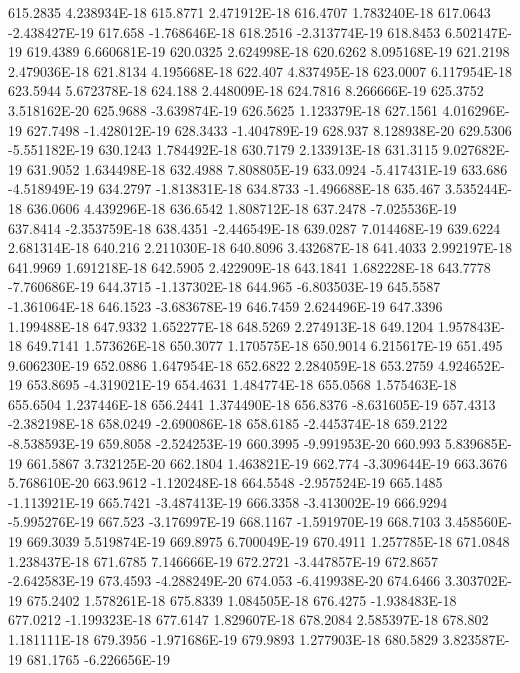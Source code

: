 615.2835  4.238934E-18
615.8771  2.471912E-18
616.4707  1.783240E-18
617.0643  -2.438427E-19
617.658  -1.768646E-18
618.2516  -2.313774E-19
618.8453  6.502147E-19
619.4389  6.660681E-19
620.0325  2.624998E-18
620.6262  8.095168E-19
621.2198  2.479036E-18
621.8134  4.195668E-18
622.407  4.837495E-18
623.0007  6.117954E-18
623.5944  5.672378E-18
624.188  2.448009E-18
624.7816  8.266666E-19
625.3752  3.518162E-20
625.9688  -3.639874E-19
626.5625  1.123379E-18
627.1561  4.016296E-19
627.7498  -1.428012E-19
628.3433  -1.404789E-19
628.937  8.128938E-20
629.5306  -5.551182E-19
630.1243  1.784492E-18
630.7179  2.133913E-18
631.3115  9.027682E-19
631.9052  1.634498E-18
632.4988  7.808805E-19
633.0924  -5.417431E-19
633.686  -4.518949E-19
634.2797  -1.813831E-18
634.8733  -1.496688E-18
635.467  3.535244E-18
636.0606  4.439296E-18
636.6542  1.808712E-18
637.2478  -7.025536E-19
637.8414  -2.353759E-18
638.4351  -2.446549E-18
639.0287  7.014468E-19
639.6224  2.681314E-18
640.216  2.211030E-18
640.8096  3.432687E-18
641.4033  2.992197E-18
641.9969  1.691218E-18
642.5905  2.422909E-18
643.1841  1.682228E-18
643.7778  -7.760686E-19
644.3715  -1.137302E-18
644.965  -6.803503E-19
645.5587  -1.361064E-18
646.1523  -3.683678E-19
646.7459  2.624496E-19
647.3396  1.199488E-18
647.9332  1.652277E-18
648.5269  2.274913E-18
649.1204  1.957843E-18
649.7141  1.573626E-18
650.3077  1.170575E-18
650.9014  6.215617E-19
651.495  9.606230E-19
652.0886  1.647954E-18
652.6822  2.284059E-18
653.2759  4.924652E-19
653.8695  -4.319021E-19
654.4631  1.484774E-18
655.0568  1.575463E-18
655.6504  1.237446E-18
656.2441  1.374490E-18
656.8376  -8.631605E-19
657.4313  -2.382198E-18
658.0249  -2.690086E-18
658.6185  -2.445374E-18
659.2122  -8.538593E-19
659.8058  -2.524253E-19
660.3995  -9.991953E-20
660.993  5.839685E-19
661.5867  3.732125E-20
662.1804  1.463821E-19
662.774  -3.309644E-19
663.3676  5.768610E-20
663.9612  -1.120248E-18
664.5548  -2.957524E-19
665.1485  -1.113921E-19
665.7421  -3.487413E-19
666.3358  -3.413002E-19
666.9294  -5.995276E-19
667.523  -3.176997E-19
668.1167  -1.591970E-19
668.7103  3.458560E-19
669.3039  5.519874E-19
669.8975  6.700049E-19
670.4911  1.257785E-18
671.0848  1.238437E-18
671.6785  7.146666E-19
672.2721  -3.447857E-19
672.8657  -2.642583E-19
673.4593  -4.288249E-20
674.053  -6.419938E-20
674.6466  3.303702E-19
675.2402  1.578261E-18
675.8339  1.084505E-18
676.4275  -1.938483E-18
677.0212  -1.199323E-18
677.6147  1.829607E-18
678.2084  2.585397E-18
678.802  1.181111E-18
679.3956  -1.971686E-19
679.9893  1.277903E-18
680.5829  3.823587E-19
681.1765  -6.226656E-19
